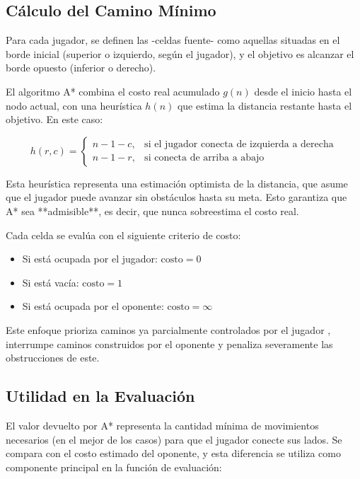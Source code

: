 \documentclass[12pt]{article}
\begin{document}
\subsection{Cálculo del Camino Mínimo}

Para cada jugador, se definen las -celdas fuente- como aquellas situadas en el borde inicial (superior o izquierdo, según el jugador), y el objetivo es alcanzar el borde opuesto (inferior o derecho).

El algoritmo A* combina el costo real acumulado \( g(n) \) desde el inicio hasta el nodo actual, con una heurística \( h(n) \) que estima la distancia restante hasta el objetivo. En este caso:

\[
h(r, c) = 
\begin{cases}
n - 1 - c, & \text{si el jugador conecta de izquierda a derecha} \\
n - 1 - r, & \text{si conecta de arriba a abajo}
\end{cases}
\]

Esta heurística representa una estimación optimista de la distancia, que asume que el jugador puede avanzar sin obstáculos hasta su meta. Esto garantiza que A* sea **admisible**, es decir, que nunca sobreestima el costo real.

Cada celda se evalúa con el siguiente criterio de costo:

\begin{itemize}
  \item Si está ocupada por el jugador: \( \text{costo} = 0 \)
  \item Si está vacía: \( \text{costo} = 1 \)
  \item Si está ocupada por el oponente: \( \text{costo} = \infty \)
\end{itemize}

Este enfoque prioriza caminos ya parcialmente controlados por el jugador , interrumpe caminos construidos por el oponente y penaliza severamente las obstrucciones de este.

\subsection{Utilidad en la Evaluación}

El valor devuelto por A* representa la cantidad mínima de movimientos necesarios (en el mejor de los casos) para que el jugador conecte sus lados. Se compara con el costo estimado del oponente, y esta diferencia se utiliza como componente principal en la función de evaluación:
\end{document}
